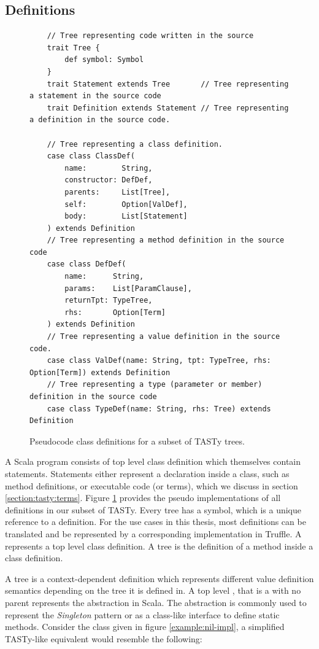 \subsection{Definitions}

\begin{figure}[!htb]
	\begin{verbatim}
	// Tree representing code written in the source
	trait Tree {
		def symbol: Symbol
	}                         
	trait Statement extends Tree       // Tree representing a statement in the source code
	trait Definition extends Statement // Tree representing a definition in the source code.
		
	// Tree representing a class definition.
	case class ClassDef(
		name:        String,
		constructor: DefDef, 
		parents:     List[Tree], 
		self:        Option[ValDef], 
		body:        List[Statement]
	) extends Definition
	// Tree representing a method definition in the source code
	case class DefDef(
		name:      String, 
		params:    List[ParamClause], 
		returnTpt: TypeTree, 
		rhs:       Option[Term]
	) extends Definition
	// Tree representing a value definition in the source code.
	case class ValDef(name: String, tpt: TypeTree, rhs: Option[Term]) extends Definition
	// Tree representing a type (parameter or member) definition in the source code
	case class TypeDef(name: String, rhs: Tree) extends Definition
	\end{verbatim} 
	\caption{Pseudocode class definitions for a subset of TASTy trees.}
	\label{tasty:defs}
\end{figure}

A Scala program consists of top level class definition which themselves contain statements.
Statements either represent a declaration inside a class, such as method definitions, or executable code (or terms), which we discuss in section \ref{section:tasty:terms}.
Figure \ref{tasty:defs} provides the pseudo implementations of all definitions in our subset of TASTy.
Every tree has a symbol, which is a unique reference to a definition.
For the use cases in this thesis, most definitions can be translated and be represented by a corresponding implementation in Truffle.
A  represents a top level class definition.
A  tree is the definition of a method inside a class definition.

A  tree is a context-dependent definition which represents different value definition semantics depending on the tree it is defined in.
A top level , that is a  with no parent represents the  abstraction in Scala.
The  abstraction is commonly used to represent the \textit{Singleton} pattern\cite{go4:design-patterns} or as a class-like interface to define static methods.
Consider the  class given in figure \ref{example:nil-impl}, a simplified TASTy-like equivalent would resemble the following:

